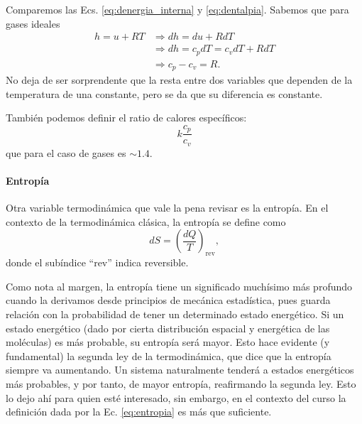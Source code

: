 Comparemos las Ecs. \eqref{eq:denergia_interna} y \eqref{eq:dentalpia}.
Sabemos que para gases ideales
%
\begin{align}
h = u + RT &\Rightarrow dh = du + RdT\nonumber\\
&\Rightarrow dh = c_pdT = c_vdT + RdT\nonumber\\
&\Rightarrow c_p-c_v=R.
\end{align}
%
No deja de ser sorprendente que la resta entre dos variables que dependen de la temperatura de una constante, pero se da que su diferencia es constante.

También podemos definir el ratio de calores específicos:
%
\begin{equation}
k \frac{c_p}{c_v}
\end{equation}
%
que para el caso de gases es $\sim1.4$.

\paragraph*{Entropía}
Otra variable termodinámica que vale la pena revisar es la entropía.
En el contexto de la termodinámica clásica, la entropía se define como
%
\begin{equation}\label{eq:entropia}
dS = \left(\frac{dQ}{T}\right)_\text{rev},
\end{equation}
%
donde el subíndice ``rev'' indica reversible. 

Como nota al margen, la entropía tiene un significado muchísimo más profundo cuando la derivamos desde principios de mecánica estadística, pues guarda relación con la probabilidad de tener un determinado estado energético.
Si un estado energético (dado por cierta distribución espacial y energética de las moléculas) es más probable, su entropía será mayor.
Esto hace evidente (y fundamental) la segunda ley de la termodinámica, que dice que la entropía siempre va aumentando.
Un sistema naturalmente tenderá a estados energéticos más probables, y por tanto, de mayor entropía, reafirmando la segunda ley.
Esto lo dejo ahí para quien esté interesado, sin embargo, en el contexto del curso la definición dada por la Ec. \eqref{eq:entropia} es más que suficiente.

